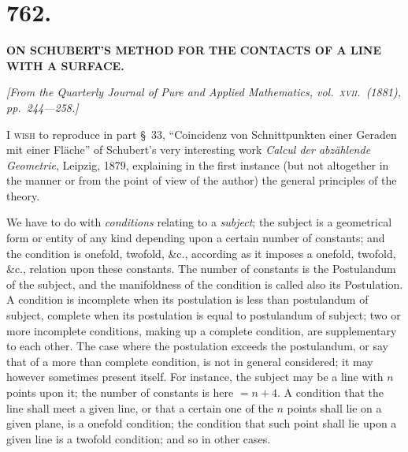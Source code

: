 \documentclass[11pt,a4paper]{book}
\begin{document}
\newpage

\section*{762.}

\begin{center}
\textbf{ON SCHUBERT'S METHOD FOR THE CONTACTS OF A LINE WITH A SURFACE.}
\end{center}

\noindent\textit{[From the \textit{Quarterly Journal of Pure and Applied Mathematics}, vol.\ \textsc{xvii}.\ (1881), pp.\ 244---258.]}

\vspace{\baselineskip}

I \textsc{wish} to reproduce in part \S\ 33, ``Coincidenz von Schnittpunkten einer Geraden mit einer Fl\"{a}che'' of Schubert's very interesting work \textit{Calcul der abz\"{a}hlende Geometrie}, Leipzig, 1879, explaining in the first instance (but not altogether in the manner or from the point of view of the author) the general principles of the theory.

We have to do with \textit{conditions} relating to a \textit{subject}; the subject is a geometrical form or entity of any kind depending upon a certain number of constants; and the condition is onefold, twofold, \&c., according as it imposes a onefold, twofold, \&c., relation upon these constants. The number of constants is the Postulandum of the subject, and the manifoldness of the condition is called also its Postulation. A condition is incomplete when its postulation is less than postulandum of subject, complete when its postulation is equal to postulandum of subject; two or more incomplete conditions, making up a complete condition, are supplementary to each other. The case where the postulation exceeds the postulandum, or say that of a more than complete condition, is not in general considered; it may however sometimes present itself. For instance, the subject may be a line with $n$ points upon it; the number of constants is here $= n + 4$. A condition that the line shall meet a given line, or that a certain one of the $n$ points shall lie on a given plane, is a onefold condition; the condition that such point shall lie upon a given line is a twofold condition; and so in other cases.
\end{document}
